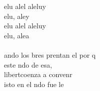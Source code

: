 \begin{cancion}%
	elu  alel aleluy\\
	elu, aley\\
	elu  alel aleluy\\
	elu, alea\\
\jump\\
	ando los bres prentan el por q \\
	 este ndo de esa,\\
	 libertcoenza a convenr\\
	isto en el ndo fue le\\
\end{cancion}%
